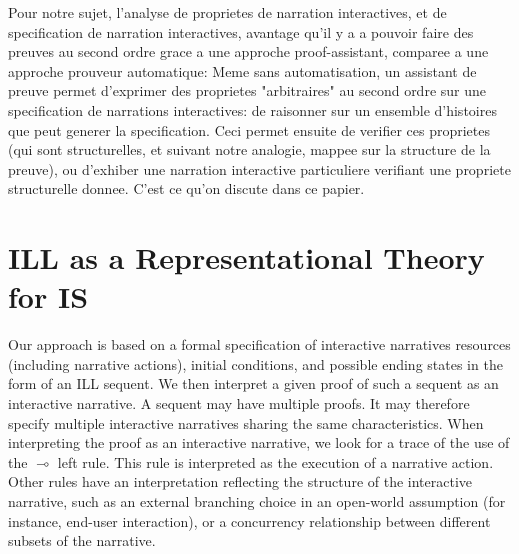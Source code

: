 \documentclass[runningheads,a4paper]{llncs}
\begin{document}
Pour notre sujet, l'analyse de proprietes de narration interactives, et de specification de narration interactives, avantage qu'il y a a pouvoir faire des preuves au second ordre grace a une approche proof-assistant, comparee a une approche prouveur automatique: Meme sans automatisation, un assistant de preuve permet d'exprimer des proprietes "arbitraires" au second ordre sur une specification de narrations interactives: de raisonner sur un ensemble d'histoires que peut generer la specification. Ceci permet ensuite de verifier ces proprietes (qui sont structurelles, et suivant notre analogie, mappee sur la structure de la preuve), ou d'exhiber une narration interactive particuliere verifiant une propriete structurelle donnee. C'est ce qu'on discute dans ce papier.
\section{ILL as a Representational Theory for IS}
%
Our approach is based on a formal specification of interactive narratives resources (including narrative actions), initial conditions, and possible ending states in the form of an ILL sequent. We then interpret a given proof of such a sequent as an interactive narrative. A sequent may have multiple proofs. It may therefore specify multiple interactive narratives sharing the same characteristics. When interpreting the proof as an interactive narrative, we look for a trace of the use of the $\multimap$ left rule. This rule is interpreted as the execution of a narrative action. Other rules have an interpretation reflecting the structure of the interactive narrative, such as an external branching choice in an open-world assumption (for instance, end-user interaction), or a concurrency relationship between different subsets of the narrative. 
\end{document}
